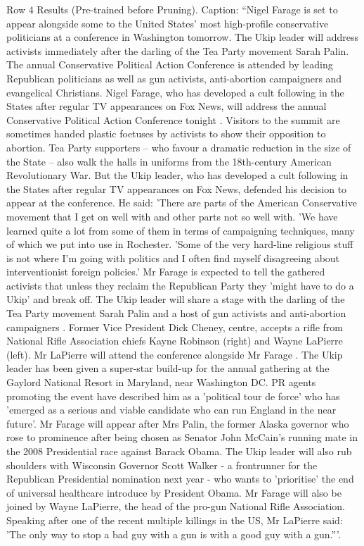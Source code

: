 \begin{table}[H]
\centering
\caption{Row 4 Results (Pre-trained before Pruning). \ifshowcaption{}Caption: ``Nigel Farage is set to appear alongside some to the United States' most high-profile conservative politicians at a conference in Washington tomorrow. The Ukip leader will address activists immediately after the darling of the Tea Party movement Sarah Palin. The annual Conservative Political Action Conference is attended by leading Republican politicians as well as gun activists, anti-abortion campaigners and evangelical Christians. Nigel Farage, who has developed a cult following in the States after regular TV appearances on Fox News, will address the annual Conservative Political Action Conference tonight . Visitors to the summit are sometimes handed plastic foetuses by activists to show their opposition to abortion. Tea Party supporters – who favour a dramatic reduction in the size of the State – also walk the halls in uniforms from the 18th-century American Revolutionary War. But the Ukip leader, who has developed a cult following in the States after regular TV appearances on Fox News, defended his decision to appear at the conference. He said: 'There are parts of the American Conservative movement that I get on well with and other parts not so well with. 'We have learned quite a lot from some of them in terms of campaigning techniques, many of which we put into use in Rochester. 'Some of the very hard-line religious stuff is not where I'm going with politics and I often find myself disagreeing about interventionist foreign policies.' Mr Farage is expected to tell the gathered activists that unless they reclaim the Republican Party they 'might have to do a Ukip' and break off. The Ukip leader will share a stage with the darling of the Tea Party movement Sarah Palin and a host of gun activists and anti-abortion campaigners . Former Vice President Dick Cheney, centre, accepts a rifle from National Rifle Association chiefs Kayne Robinson (right) and Wayne LaPierre (left). Mr LaPierre will attend the conference alongside Mr Farage . The Ukip leader has been given a super-star build-up for the annual gathering at the Gaylord National Resort in Maryland, near Washington DC. PR agents promoting the event have described him as a 'political tour de force' who has 'emerged as a serious and viable candidate who can run England in the near future'. Mr Farage will appear after Mrs Palin, the former Alaska governor who rose to prominence after being chosen as Senator John McCain's running mate in the 2008 Presidential race against Barack Obama. The Ukip leader will also rub shoulders with Wisconsin Governor Scott Walker - a frontrunner for the Republican Presidential nomination next year - who wants to 'prioritise' the end of universal healthcare introduce by President Obama. Mr Farage will also be joined by Wayne LaPierre, the head of the pro-gun National Rifle Association. Speaking after one of the recent multiple killings in the US, Mr LaPierre said: 'The only way to stop a bad guy with a gun is with a good guy with a gun.'''.\fi}

\end{table}
